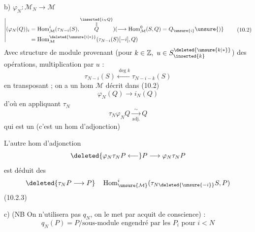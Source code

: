 b) $\varphi_N:\mathcal M_N\longrightarrow\mathcal M$
\[
\left|\begin{aligned}
(\varphi_N(Q))_i&=\operatorname{Hom}_{\mathcal M}^{i}(\tau_{N-i}(S),\overset{\substack{\inserted{i_N Q}\\\Vert}}{Q})(\longrightarrow\operatorname{Hom}_{\mathcal M}^{0}(S,Q)=Q_{\unsure{i}}\unsure{)}\\
&=\operatorname{Hom}_{\mathcal M}^{\deleted{\unsure{i|*}}}(\tau_{N-i}(S)[-i],Q)
\end{aligned}\right.\tag*{(10.2)}
\]
Avec  structure de module provenant (pour $k\in\mathbb Z,\ u\in S_{\inserted{k}}^{\deleted{\unsure{k|*}}}$) des opérations, multiplication par $u$ :
\[
\tau_{N-i}(S)\xleftarrow{\deg k}\tau_{N-i-k}(S)
\]
en transposant ; on a un hom   $\mathcal M$ décrit dans (10.2)
\[
\varphi_N(Q)\longrightarrow i_N(Q)\tag*{(10.2.1)}
\]
d'où en appliquant $\tau_N$
\[
\tau_N\varphi_N Q\xrightarrow[\text{adj.}]{\sim}Q\tag*{(10.2.2)}
\]
qui est un  (c'est un hom d'adjonction)

L'autre hom d'adjonction
\[
\deleted{\varphi_N\tau_N P\longleftarrow}P\longrightarrow\varphi_N\tau_N P
\]
est déduit des  
\[
\deleted{\tau_N P\longrightarrow P}\quad \operatorname{Hom}_{\unsure{\mathcal M}}^{i}(\tau_{N\deleted{\unsure{-i}}}S,P)
\]
\noindent (10.2.3)

c) (NB On n'utilisera pas $q_N$, on le met par acquit de conscience) :
\[
q_N(P)=P/\text{sous-module engendré par les }P_i\text{ pour }i<N
\]

